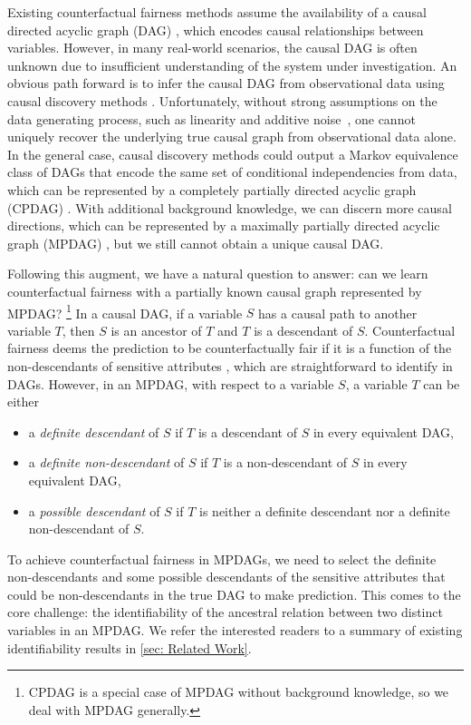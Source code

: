 \documentclass{article}
\begin{document}
Existing counterfactual fairness methods assume the availability of a causal directed acyclic graph (DAG) \citep{pearl2009causality}, which encodes causal relationships between variables. However, in many real-world scenarios, the causal DAG is often unknown due to insufficient understanding of the system under investigation. 
An obvious path forward is to infer the causal DAG from observational data using causal discovery methods \citep{spirtes1991algorithm, colombo2014order, spirtes2000constructing, chickering2002optimal, shimizu2006linear,hoyer2008nonlinear, zhang2009identifiability, peters2014causal, peters2014identifiability}. Unfortunately, without strong assumptions on the data generating process, such as linearity \citep{shimizu2006linear} and additive noise~\citep{hoyer2008nonlinear, peters2014causal}, one cannot uniquely recover the underlying true causal graph from observational data alone. In the general case, causal discovery methods could output a Markov equivalence class of DAGs that encode the same set of conditional independencies from data, which can be represented by a completely partially directed acyclic graph (CPDAG) \citep{spirtes2000causation, chickering2002optimal}. With additional background knowledge, we can discern more causal directions, which can be represented by a maximally partially directed acyclic graph (MPDAG) \citep{meek1995causal}, but we still cannot obtain a unique causal DAG. 

Following this augment, we have a natural question to answer: can we learn counterfactual fairness with a partially known causal graph represented by MPDAG? \footnote{CPDAG is a special case of MPDAG without background knowledge, so we deal with MPDAG generally.}
In a causal DAG, if a variable $S$ has a causal path to another variable $T$, then $S$ is an ancestor of $T$ and $T$ is a descendant of $S$. Counterfactual fairness deems the prediction to be counterfactually fair if it is a function of the non-descendants of sensitive attributes \citep{kusner2017counterfactual}, which are straightforward to identify in DAGs. 
However, in an MPDAG, with respect to a variable $S$, a variable $T$ can be either
\begin{itemize}
\itemsep0em
    \item a \textit{definite descendant} of $S$ if $T$ is a descendant of $S$ in every equivalent DAG,
    \item a \textit{definite non-descendant} of $S$ if $T$ is a non-descendant of $S$ in every equivalent DAG,
    \item a \textit{possible descendant} of $S$ if $T$ is neither a definite descendant nor a definite non-descendant of $S$.
\end{itemize}
To achieve counterfactual fairness in MPDAGs, we need to select the definite non-descendants and some possible descendants of the sensitive attributes that could be non-descendants in the true DAG to make prediction. This comes to the core challenge: the identifiability of the ancestral relation between two distinct variables in an MPDAG. We refer the interested readers to a summary of existing identifiability results in \cref{sec: Related Work}. 
\end{document}

